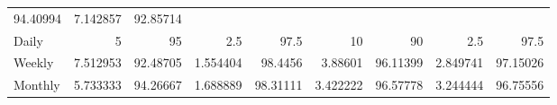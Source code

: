 \documentclass{article}
\begin{document}
\begin{tabular}{lllllllll}
  \multicolumn{1}{r}{94.40994} &
  \multicolumn{1}{r}{7.142857} &
  \multicolumn{1}{r}{92.85714} \\
\multicolumn{1}{l}{\hspace{5em}Daily} &
  \multicolumn{1}{|r}{5} &
  \multicolumn{1}{r}{95} &
  \multicolumn{1}{r}{2.5} &
  \multicolumn{1}{r}{97.5} &
  \multicolumn{1}{r}{10} &
  \multicolumn{1}{r}{90} &
  \multicolumn{1}{r}{2.5} &
  \multicolumn{1}{r}{97.5} \\
\multicolumn{1}{l}{\hspace{5em}Weekly} &
  \multicolumn{1}{|r}{7.512953} &
  \multicolumn{1}{r}{92.48705} &
  \multicolumn{1}{r}{1.554404} &
  \multicolumn{1}{r}{98.4456} &
  \multicolumn{1}{r}{3.88601} &
  \multicolumn{1}{r}{96.11399} &
  \multicolumn{1}{r}{2.849741} &
  \multicolumn{1}{r}{97.15026} \\
\multicolumn{1}{l}{\hspace{5em}Monthly} &
  \multicolumn{1}{|r}{5.733333} &
  \multicolumn{1}{r}{94.26667} &
  \multicolumn{1}{r}{1.688889} &
  \multicolumn{1}{r}{98.31111} &
  \multicolumn{1}{r}{3.422222} &
  \multicolumn{1}{r}{96.57778} &
  \multicolumn{1}{r}{3.244444} &
  \multicolumn{1}{r}{96.75556} \\
\cline{1-9}
\end{tabular}
\end{document}
